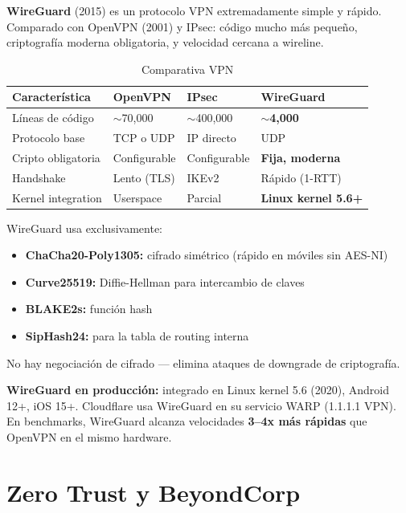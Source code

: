 \begin{concepto}
\textbf{WireGuard} (2015) es un protocolo VPN extremadamente simple y
rápido. Comparado con OpenVPN (2001) y IPsec: código mucho más pequeño,
criptografía moderna obligatoria, y velocidad cercana a wireline.
\end{concepto}

\begin{table}[h!]
\centering
\renewcommand{\arraystretch}{1.3}
\begin{tabular}{llll}
\toprule
\textbf{Característica} & \textbf{OpenVPN} & \textbf{IPsec} & \textbf{WireGuard} \\
\midrule
Líneas de código    & $\sim$70,000   & $\sim$400,000  & \textbf{$\sim$4,000} \\
Protocolo base      & TCP o UDP      & IP directo     & UDP \\
Cripto obligatoria  & Configurable   & Configurable   & \textbf{Fija, moderna} \\
Handshake           & Lento (TLS)    & IKEv2          & Rápido (1-RTT) \\
Kernel integration  & Userspace      & Parcial        & \textbf{Linux kernel 5.6+} \\
\bottomrule
\end{tabular}
\caption{Comparativa VPN}
\end{table}

WireGuard usa exclusivamente:
\begin{itemize}
    \item \textbf{ChaCha20-Poly1305:} cifrado simétrico (rápido en móviles sin AES-NI)
    \item \textbf{Curve25519:} Diffie-Hellman para intercambio de claves
    \item \textbf{BLAKE2s:} función hash
    \item \textbf{SipHash24:} para la tabla de routing interna
\end{itemize}

No hay negociación de cifrado --- elimina ataques de downgrade de criptografía.

\begin{moderno}
\textbf{ WireGuard en producción:} integrado en Linux kernel 5.6
(2020), Android 12+, iOS 15+. Cloudflare usa WireGuard en su servicio
WARP (1.1.1.1 VPN). En benchmarks, WireGuard alcanza velocidades
\textbf{3--4x más rápidas} que OpenVPN en el mismo hardware.
\end{moderno}

\section{ Zero Trust y BeyondCorp}

